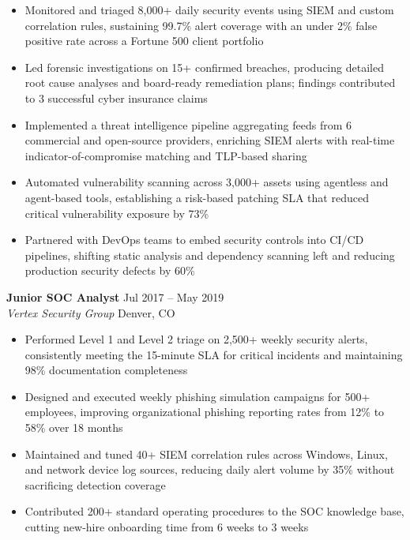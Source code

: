 \documentclass[11pt,a4paper]{article}
\newcommand{\cvdate}[1]{\textcolor{mediumgray}{\small #1}}
\begin{document}
\begin{itemize}
  \item Monitored and triaged 8,000+ daily security events using SIEM and custom correlation rules, sustaining 99.7\% alert coverage with an under 2\% false positive rate across a Fortune 500 client portfolio
  \item Led forensic investigations on 15+ confirmed breaches, producing detailed root cause analyses and board-ready remediation plans; findings contributed to 3 successful cyber insurance claims
  \item Implemented a threat intelligence pipeline aggregating feeds from 6 commercial and open-source providers, enriching SIEM alerts with real-time indicator-of-compromise matching and TLP-based sharing
  \item Automated vulnerability scanning across 3,000+ assets using agentless and agent-based tools, establishing a risk-based patching SLA that reduced critical vulnerability exposure by 73\%
  \item Partnered with DevOps teams to embed security controls into CI/CD pipelines, shifting static analysis and dependency scanning left and reducing production security defects by 60\%
\end{itemize}

\vspace{8pt}

\noindent
\textbf{Junior SOC Analyst} \hfill \cvdate{Jul 2017 -- May 2019}\\
\textit{Vertex Security Group} \textbar{} Denver, CO

\begin{itemize}
  \item Performed Level 1 and Level 2 triage on 2,500+ weekly security alerts, consistently meeting the 15-minute SLA for critical incidents and maintaining 98\% documentation completeness
  \item Designed and executed weekly phishing simulation campaigns for 500+ employees, improving organizational phishing reporting rates from 12\% to 58\% over 18 months
  \item Maintained and tuned 40+ SIEM correlation rules across Windows, Linux, and network device log sources, reducing daily alert volume by 35\% without sacrificing detection coverage
  \item Contributed 200+ standard operating procedures to the SOC knowledge base, cutting new-hire onboarding time from 6 weeks to 3 weeks
\end{itemize}
\end{document}
